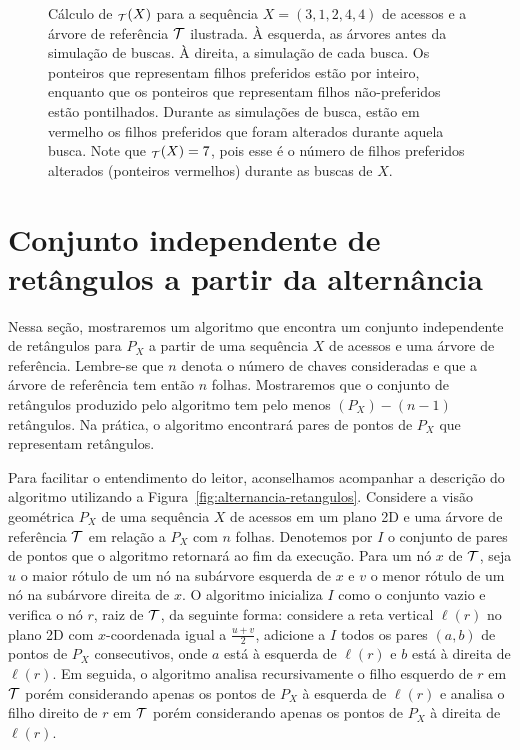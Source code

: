 \begin{figure}
    
    \caption{Cálculo de \Alt$_{\mathcal{T}}(X)$ para a sequência $X = (3,1,2,4,4)$ de acessos e a árvore de referência $\mathcal{T}$ ilustrada. À esquerda, as árvores antes da simulação de buscas. À direita, a simulação de cada busca. Os ponteiros que representam filhos preferidos estão por inteiro, enquanto que os ponteiros que representam filhos não-preferidos estão pontilhados. Durante as simulações de busca, estão em vermelho os filhos preferidos que foram alterados durante aquela busca. Note que \Alt$_{\mathcal{T}}(X) = 7$, pois esse é o número de filhos preferidos alterados (ponteiros vermelhos) durante as buscas de $X$.}
\label{fig:alternancia_abordagem_informal}
\end{figure}

\section{Conjunto independente de retângulos a partir da alternância} \label{sec:alt_com_ret}

Nessa seção, mostraremos um algoritmo que encontra um conjunto independente de retângulos para $P_X$ a partir de uma sequência $X$ de acessos e uma árvore de referência. Lembre-se que $n$ denota o número de chaves consideradas e que a árvore de referência tem então $n$ folhas. Mostraremos que o conjunto de retângulos produzido pelo algoritmo tem pelo menos \Alt$(P_X) - (n - 1)$ retângulos. Na prática, o algoritmo encontrará pares de pontos de $P_X$ que representam retângulos.

Para facilitar o entendimento do leitor, aconselhamos acompanhar a descrição do algoritmo utilizando a Figura~\ref{fig:alternancia-retangulos}.
Considere a visão geométrica $P_X$ de uma sequência $X$ de acessos em um plano 2D e uma árvore de referência $\mathcal{T}$ em relação a $P_X$ com $n$ folhas. Denotemos por $I$ o conjunto de pares de pontos que o algoritmo retornará ao fim da execução. Para um nó $x$ de $\mathcal{T}$, seja $u$ o maior rótulo de um nó na subárvore esquerda de $x$ e $v$ o menor rótulo de um nó na subárvore direita de $x$. O algoritmo inicializa $I$ como o conjunto vazio e verifica o nó $r$, raiz de $\mathcal{T}$, da seguinte forma: considere a reta vertical $\ell(r)$ no plano 2D com $x$-coordenada igual a $\frac{u+v}{2}$, adicione a $I$ todos os pares $(a,b)$ de pontos de $P_X$ consecutivos, onde $a$ está à esquerda de $\ell(r)$ e $b$ está à direita de $\ell(r)$. Em seguida, o algoritmo analisa recursivamente o filho esquerdo de $r$ em $\mathcal{T}$ porém considerando apenas os pontos de $P_X$ à esquerda de $\ell(r)$ e analisa o filho direito de $r$ em $\mathcal{T}$ porém considerando apenas os pontos de $P_X$ à direita de $\ell(r)$.

